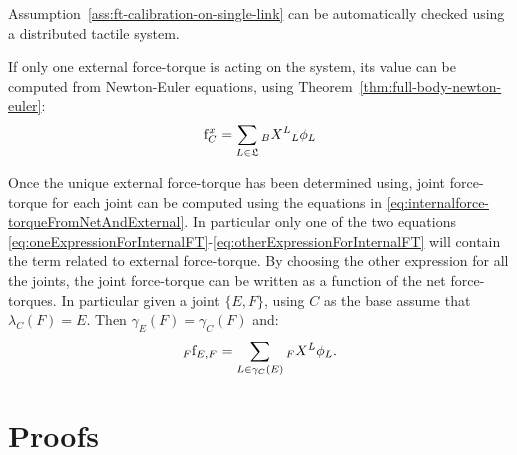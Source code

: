 \begin{remark}
Assumption~\ref{ass:ft-calibration-on-single-link} can be automatically checked using a distributed tactile system. 
\end{remark}

If only one external force-torque is acting on the system, its value can be computed from Newton-Euler equations, using Theorem~\ref{thm:full-body-newton-euler}:
\begin{equation}
\label{eq:ft-external-force-torque-single-body}
{\rm f}^x_C = \sum_{L \in \mathfrak{L}}  \hspace{0em}_B X^L \hspace{0em}_L \phi_L
\end{equation}

Once the unique external force-torque has been determined using, joint force-torque for each joint can be computed using the equations in \eqref{eq:internalforce-torqueFromNetAndExternal}. In particular only one of the two equations \eqref{eq:oneExpressionForInternalFT}-\eqref{eq:otherExpressionForInternalFT} will contain the term related to external force-torque. By choosing the other expression for all the joints, the joint force-torque can be written as a function of the net force-torques. In particular given a joint $\{ E,F \}$, using $C$ as the base assume that $\lambda_C(F) = E$. Then $\gamma_E(F) = \gamma_C(F)$ and:
\begin{equation}
\hspace{0em}_F {\rm f}_{E,F} = \sum_{L \in \gamma_C(E)} \hspace{0em}_F X^L \phi_L .
\end{equation}





\section{Proofs}
